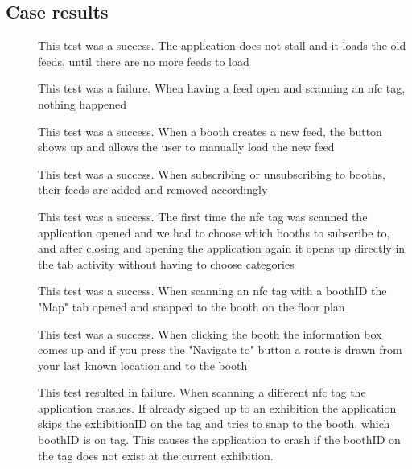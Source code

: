 \subsection*{Case results}
\begin{description}
\item[\casetwo] This test was a success. The application does not stall and it loads the old feeds, until there are no more feeds to load
\item[\casethree] This test was a failure. When having a feed open and scanning an \ac{nfc} tag, nothing happened
\item[\casefour] This test was a success. When a booth creates a new feed, the button shows up and allows the user to manually load the new feed
\item[\casefive] This test was a success. When subscribing or unsubscribing to booths, their feeds are added and removed accordingly 
\item[\casesix] This test was a success. The first time the \ac{nfc} tag was scanned the application opened and we had to choose which booths to subscribe to, and after closing and opening the application again it opens up directly in the tab activity without having to choose categories
\item[\caseseven] This test was a success. When scanning an \ac{nfc} tag with a boothID the "Map" tab opened and snapped to the booth on the floor plan
\item[\caseeight] This test was a success. When clicking the booth the information box comes up and if  you press the "Navigate to" button a route is drawn from your last known location and to the booth
\item[\casenine] This test resulted in failure. When scanning a different \ac{nfc} tag the application crashes. If already signed up to an exhibition the application skips the exhibitionID on the tag and tries to snap to the booth, which boothID is on tag. This causes the application to crash if the boothID on the tag does not exist at the current exhibition.
\end{description}
